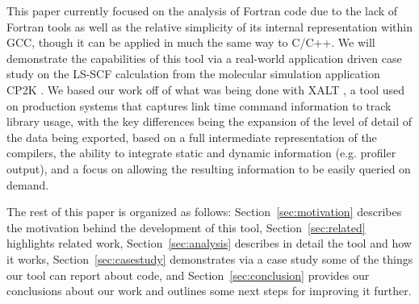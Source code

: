 This paper currently focused on the analysis of Fortran code due to the lack of Fortran tools as well as the relative 
simplicity of its internal representation within \acs{GCC}, though it can be applied in much the same way to C/C++.
We will demonstrate the capabilities of this tool via a real-world application driven case study on the \ac{LS-SCF} 
calculation \cite{vandevondele2012linear} from the molecular simulation application CP2K \cite{hutter2014cp2k}.
We based our work off of what was being done with XALT \cite{7081224}, a tool used on production systems that captures link time command information to track library usage, with the key differences being the 
expansion of the level of detail of the data being exported, based on a full intermediate representation of the compilers, the ability to integrate static and dynamic information 
(e.g. profiler output), and a focus on allowing the resulting information to be easily queried on demand.

The rest of this paper is organized as follows: Section~\ref{sec:motivation} describes the motivation behind the 
development of this tool, Section~\ref{sec:related} highlights related work, Section~\ref{sec:analysis} describes in 
detail the tool and how it works, Section~\ref{sec:casestudy} demonstrates via a case study some of the things our 
tool can report about code, and Section~\ref{sec:conclusion} provides our conclusions about our work and outlines 
some next steps for improving it further.
